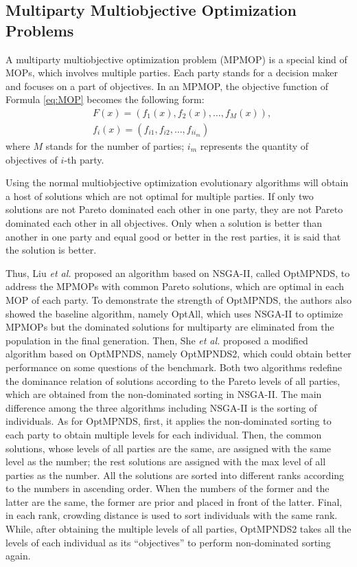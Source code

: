 \documentclass[preprint,12pt]{elsarticle}
\begin{document}
\subsection{Multiparty Multiobjective Optimization Problems}
A multiparty multiobjective optimization problem (MPMOP) is a special kind of MOPs, which involves multiple parties.
Each party stands for a decision maker and focuses on a part of objectives.
In an MPMOP, the objective function of Formula \eqref{eq:MOP} becomes the following form:
\begin{equation}
	\begin{aligned}
		 & F(x) = (f_1(x),f_2(x),\dots,f_M(x)),      \\
		 & f_i(x) = (f_{i1},f_{i2}, \dots, f_{ii_m})
	\end{aligned}
\end{equation}
where $M$ stands for the number of parties;
$i_m$ represents the quantity of objectives of $i$-th party.

Using the normal multiobjective optimization evolutionary algorithms will obtain a host of solutions which are not optimal for multiple parties.
If only two solutions are not Pareto dominated each other in one party, they are not Pareto dominated each other in all objectives.
Only when a solution is better than another in one party and equal good or better in the rest parties, it is said that the solution is better.

Thus, Liu \textit{et al.} \cite{liu2020evolutionary} proposed an algorithm based on NSGA-II, called OptMPNDS, to address the MPMOPs with common Pareto solutions, which are optimal in each MOP of each party.
To demonstrate the strength of OptMPNDS, the authors also showed the baseline algorithm, namely OptAll, which uses NSGA-II to optimize MPMOPs but the dominated solutions for multiparty are eliminated from the population in the final generation.
Then, She \textit{et al.} \cite{she2021new} proposed a modified algorithm based on OptMPNDS, namely OptMPNDS2, which could obtain better performance on some questions of the benchmark.
Both two algorithms redefine the dominance relation of solutions according to the Pareto levels of all parties, which are obtained from the non-dominated sorting in NSGA-II.
The main difference among the three algorithms including NSGA-II is the sorting of individuals.
As for OptMPNDS, first, it applies the non-dominated sorting to each party to obtain multiple levels for each individual.
Then, the common solutions, whose levels of all parties are the same, are assigned with the same level as the number; the rest solutions are assigned with the max level of all parties as the number.
All the solutions are sorted into different ranks according to the numbers in ascending order.
When the numbers of the former and the latter are the same, the former are prior and placed in front of the latter.
Final, in each rank, crowding distance is used to sort individuals with the same rank.
While, after obtaining the multiple levels of all parties, OptMPNDS2 takes all the levels of each individual as its ``objectives” to perform non-dominated sorting again.
\end{document}
